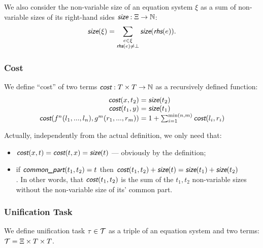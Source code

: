 We also consider the non-variable size of an equation system $\xi$ as a sum of non-variable sizes of its right-hand sides $\size : \Xi \rightarrow \N$:
\[\size(\xi) = \sum_{\substack{e \in \xi \\ \rhs(e) \neq \bot}} \size(\rhs(e)).\]


\subsubsection{Cost}

We define ``cost'' of two terms $\cost : T \times T \rightarrow \N$ as a recursively defined function:
\begin{equation*}
    \begin{array}{r@{{}={}}l}
        \cost(x, t_2) & \size(t_2) \\
        \cost(t_1, y) & \size(t_1) \\
        \cost(f^n(l_1, ..., l_n), g^m(r_1, ..., r_m)) & 1 + \sum_{i = 1}^{\min(n, m)} \cost(l_i, r_i) \\
    \end{array}
\end{equation*}

Actually, independently from the actual definition, we only need that:
\begin{itemize}
    \item $\cost(x, t) = \cost(t, x) = \size(t)$ --- obviously by the definition;
    \item if $\commonpart(t_1, t_2) = t$ then $\cost(t_1, t_2) + \size(t) = \size(t_1) + \size(t_2)$ \\
    . In other words, that $\cost(t_1, t_2)$ is the sum of the $t_1, t_2$ non-variable sizes without the non-variable size of its' common part.
\end{itemize}


\subsubsection{Unification Task}

We define unification task $\tau \in \mathcal{T}$ as a triple of an equation system and two terms: $\mathcal{T} = \Xi \times T \times T$.

